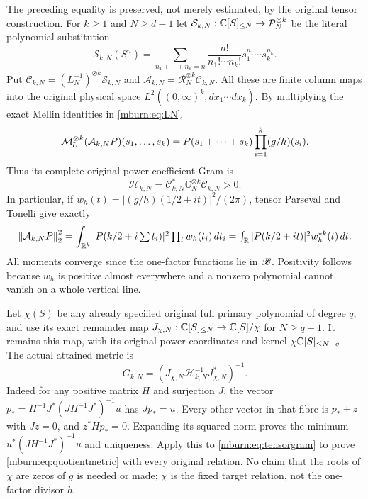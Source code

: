 The preceding equality is preserved, not merely estimated, by
the original tensor construction. For $k\geq1$ and $N\geq d-1$
let $\mathcal S_{k,N}:\mathbb C[S]_{\leq N}\to\mathcal P_N^{\otimes k}$
be the literal polynomial substitution
\begin{equation}\label{mburn:eq:multinomial}
 \mathcal S_{k,N}(S^n)=
 \sum_{n_1+\cdots+n_k=n}\frac{n!}{n_1!\cdots n_k!}
                                  s_1^{n_1}\cdots s_k^{n_k}.
\end{equation}
Put $\mathcal C_{k,N}=(L_N^{-1})^{\otimes k}\mathcal S_{k,N}$
and $\mathcal A_{k,N}=\mathcal R_N^{\otimes k}\mathcal C_{k,N}$.
All these are finite column maps into the original physical
space $L^2((0,\infty)^k,dx_1\cdots dx_k)$. By multiplying
the exact Mellin identities in \eqref{mburn:eq:LN},
\begin{equation}\label{mburn:eq:tensorsource}
 \mathcal M_{\!L}^{\otimes k}(\mathcal A_{k,N}P)(s_1,\ldots,s_k)
           =P(s_1+\cdots+s_k)\prod_{i=1}^k(g/h)(s_i).
\end{equation}
Thus its complete original power-coefficient Gram is
\begin{equation}\label{mburn:eq:tensorgram}
 \mathcal H_{k,N}=\mathcal C_{k,N}^*
                    \mathbb G_N^{\otimes k}\mathcal C_{k,N}>0.
\end{equation}
In particular, if $w_h(t)=|(g/h)(1/2+it)|^2/(2\pi)$,
tensor Parseval and Tonelli give exactly
\begin{equation}\label{mburn:eq:convolutionmetric}
 \left\lVert\mathcal A_{k,N}P\right\rVert_2^2
  =\int_{\mathbb R^k}|P(k/2+i\textstyle\sum t_i)|^2
                       \prod_iw_h(t_i)\,dt_i
  =\int_\mathbb R|P(k/2+it)|^2w_h^{*k}(t)\,dt.
\end{equation}
All moments converge since the one-factor functions lie in
$\mathscr B$. Positivity follows because $w_h$ is positive almost
everywhere and a nonzero polynomial cannot vanish on a
whole vertical line.

Let $\chi(S)$ be any already specified original full primary
polynomial of degree $q$, and use its exact remainder map
$J_{\chi,N}:\mathbb C[S]_{\leq N}\to\mathbb C[S]/\chi$ for $N\geq q-1$.
It remains this map, with its original power coordinates and
kernel $\chi\mathbb C[S]_{\leq N-q}$. The actual attained metric is
\begin{equation}\label{mburn:eq:quotientmetric}
 G_{k,N}=\left(J_{\chi,N}\mathcal H_{k,N}^{-1}
                                           J_{\chi,N}^*\right)^{-1}.
\end{equation}
Indeed for any positive matrix $H$ and surjection $J$, the
vector $p_*=H^{-1}J^*(JH^{-1}J^*)^{-1}u$ has $Jp_*=u$.
Every other vector in that fibre is $p_*+z$ with $Jz=0$,
and $z^*Hp_*=0$. Expanding its squared norm proves the
minimum $u^*(JH^{-1}J^*)^{-1}u$ and uniqueness.
Apply this to \eqref{mburn:eq:tensorgram} to prove
\eqref{mburn:eq:quotientmetric} with every original relation.
No claim that the roots of $\chi$ are zeros of $g$ is needed
or made; $\chi$ is the fixed target relation, not the
one-factor divisor $h$.

